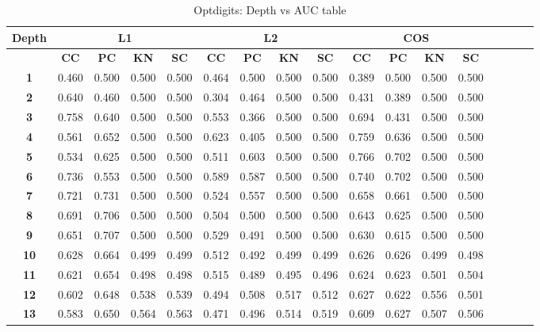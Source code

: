 \begin{table*}[!t]
\caption{Optdigits: Depth vs AUC table}
\label{comparisons:optdigits}
\centering
\begin{tabular}{|c|c|c|c|c|c|c|c|c|c|c|c|c|c|c|c|c|}
\hline
\bfseries Depth & \multicolumn{4}{c|}{\textbf{L1}} & \multicolumn{4}{c|}{\textbf{L2}} & \multicolumn{4}{c|}{\textbf{COS}} \\
\hline
\bfseries  & \bfseries CC & \bfseries PC & \bfseries KN & \bfseries SC & \bfseries CC & \bfseries PC & \bfseries KN & \bfseries SC & \bfseries CC & \bfseries PC & \bfseries KN & \bfseries SC \\
\hline
\bfseries 1 & 0.460 & 0.500 & 0.500 & 0.500 & 0.464 & 0.500 & 0.500 & 0.500 & 0.389 & 0.500 & 0.500 & 0.500 \\
\hline
\bfseries 2 & 0.640 & 0.460 & 0.500 & 0.500 & 0.304 & 0.464 & 0.500 & 0.500 & 0.431 & 0.389 & 0.500 & 0.500 \\
\hline
\bfseries 3 & 0.758 & 0.640 & 0.500 & 0.500 & 0.553 & 0.366 & 0.500 & 0.500 & 0.694 & 0.431 & 0.500 & 0.500 \\
\hline
\bfseries 4 & 0.561 & 0.652 & 0.500 & 0.500 & 0.623 & 0.405 & 0.500 & 0.500 & 0.759 & 0.636 & 0.500 & 0.500 \\
\hline
\bfseries 5 & 0.534 & 0.625 & 0.500 & 0.500 & 0.511 & 0.603 & 0.500 & 0.500 & 0.766 & 0.702 & 0.500 & 0.500 \\
\hline
\bfseries 6 & 0.736 & 0.553 & 0.500 & 0.500 & 0.589 & 0.587 & 0.500 & 0.500 & 0.740 & 0.702 & 0.500 & 0.500 \\
\hline
\bfseries 7 & 0.721 & 0.731 & 0.500 & 0.500 & 0.524 & 0.557 & 0.500 & 0.500 & 0.658 & 0.661 & 0.500 & 0.500 \\
\hline
\bfseries 8 & 0.691 & 0.706 & 0.500 & 0.500 & 0.504 & 0.500 & 0.500 & 0.500 & 0.643 & 0.625 & 0.500 & 0.500 \\
\hline
\bfseries 9 & 0.651 & 0.707 & 0.500 & 0.500 & 0.529 & 0.491 & 0.500 & 0.500 & 0.630 & 0.615 & 0.500 & 0.500 \\
\hline
\bfseries 10 & 0.628 & 0.664 & 0.499 & 0.499 & 0.512 & 0.492 & 0.499 & 0.499 & 0.626 & 0.626 & 0.499 & 0.498 \\
\hline
\bfseries 11 & 0.621 & 0.654 & 0.498 & 0.498 & 0.515 & 0.489 & 0.495 & 0.496 & 0.624 & 0.623 & 0.501 & 0.504 \\
\hline
\bfseries 12 & 0.602 & 0.648 & 0.538 & 0.539 & 0.494 & 0.508 & 0.517 & 0.512 & 0.627 & 0.622 & 0.556 & 0.501 \\
\hline
\bfseries 13 & 0.583 & 0.650 & 0.564 & 0.563 & 0.471 & 0.496 & 0.514 & 0.519 & 0.609 & 0.627 & 0.507 & 0.506 \\

\end{tabular}
\end{table*}
